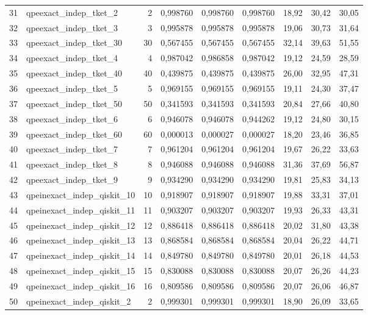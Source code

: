 \documentclass[a4paper,10pt]{article}
\begin{document}
\begin{landscape}
\begin{longtable}{r l r rrr rrr}
31 & qpeexact\_indep\_tket\_2 & 2 & 0,998760 & 0,998760 & 0,998760 & 18,92 & 30,42 & 30,05\\
32 & qpeexact\_indep\_tket\_3 & 3 & 0,995878 & 0,995878 & 0,995878 & 19,06 & 30,73 & 31,64\\
33 & qpeexact\_indep\_tket\_30 & 30 & 0,567455 & 0,567455 & 0,567455 & 32,14 & 39,63 & 51,55\\
34 & qpeexact\_indep\_tket\_4 & 4 & 0,987042 & 0,986858 & 0,987042 & 19,12 & 24,59 & 28,59\\
35 & qpeexact\_indep\_tket\_40 & 40 & 0,439875 & 0,439875 & 0,439875 & 26,00 & 32,95 & 47,31\\
36 & qpeexact\_indep\_tket\_5 & 5 & 0,969155 & 0,969155 & 0,969155 & 19,11 & 24,30 & 37,47\\
37 & qpeexact\_indep\_tket\_50 & 50 & 0,341593 & 0,341593 & 0,341593 & 20,84 & 27,66 & 40,80\\
38 & qpeexact\_indep\_tket\_6 & 6 & 0,946078 & 0,946078 & 0,944262 & 19,12 & 24,80 & 30,15\\
39 & qpeexact\_indep\_tket\_60 & 60 & 0,000013 & 0,000027 & 0,000027 & 18,20 & 23,46 & 36,85\\
40 & qpeexact\_indep\_tket\_7 & 7 & 0,961204 & 0,961204 & 0,961204 & 19,67 & 26,22 & 33,63\\
41 & qpeexact\_indep\_tket\_8 & 8 & 0,946088 & 0,946088 & 0,946088 & 31,36 & 37,69 & 56,87\\
42 & qpeexact\_indep\_tket\_9 & 9 & 0,934290 & 0,934290 & 0,934290 & 19,81 & 25,83 & 34,13\\
43 & qpeinexact\_indep\_qiskit\_10 & 10 & 0,918907 & 0,918907 & 0,918907 & 19,88 & 33,31 & 37,01\\
44 & qpeinexact\_indep\_qiskit\_11 & 11 & 0,903207 & 0,903207 & 0,903207 & 19,93 & 26,33 & 43,31\\
45 & qpeinexact\_indep\_qiskit\_12 & 12 & 0,886418 & 0,886418 & 0,886418 & 20,02 & 31,80 & 43,38\\
46 & qpeinexact\_indep\_qiskit\_13 & 13 & 0,868584 & 0,868584 & 0,868584 & 20,04 & 26,22 & 44,71\\
47 & qpeinexact\_indep\_qiskit\_14 & 14 & 0,849780 & 0,849780 & 0,849780 & 20,01 & 26,18 & 44,53\\
48 & qpeinexact\_indep\_qiskit\_15 & 15 & 0,830088 & 0,830088 & 0,830088 & 20,07 & 26,26 & 44,23\\
49 & qpeinexact\_indep\_qiskit\_16 & 16 & 0,809586 & 0,809586 & 0,809586 & 20,07 & 26,06 & 46,87\\
50 & qpeinexact\_indep\_qiskit\_2 & 2 & 0,999301 & 0,999301 & 0,999301 & 18,90 & 26,09 & 33,65\\

\end{longtable}
\end{landscape}
\end{document}
